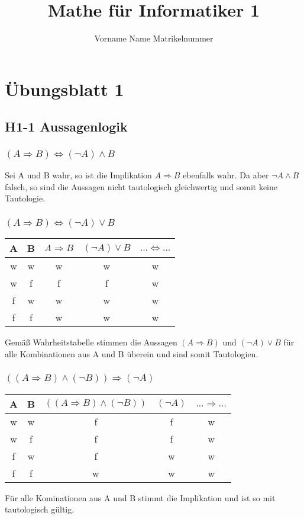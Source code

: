 \documentclass{article}
\title{Mathe für Informatiker 1}
\author{Vorname Name Matrikelnummer}
\begin{document}
\maketitle

\section{Übungsblatt 1}
\subsection{H1-1 Aussagenlogik}
\subsubsection{\((A \Rightarrow B) \iff (\neg A) \land B  \)}

Sei A und B wahr, so ist die Implikation \(A \Rightarrow B\) ebenfalls wahr.
Da aber \(\neg A \land B  \) falsch, so sind die Aussagen nicht tautologisch gleichwertig und somit keine Tautologie.

\subsubsection{\((A \Rightarrow B) \iff (\neg A) \lor B  \)}
\begin{center}
\begin{tabular}{||c c | c c | c ||}
  A & B & \(A \Rightarrow B\) & \((\neg A) \lor B\) &\(... \iff ...\) \\
  \hline
  w & w & w & w & w \\
  w & f & f & f & w \\
  f & w & w & w & w \\
  f & f & w & w & w \\
\end{tabular}
\end{center}
Gemäß Wahrheitstabelle stimmen die Aussagen \((A \Rightarrow B) \) und \( (\neg A) \lor B  \)  für alle Kombinationen aus A und B überein und sind somit Tautologien.

\subsubsection{\(((A \Rightarrow B) \land (\neg B)) \Rightarrow  (\neg A)  \)}

\begin{center}
\begin{tabular}{||c c | c c| c ||}
  A & B & \(((A \Rightarrow B) \land (\neg B))\) & \((\neg A)\)  & \(... \Rightarrow ...\) \\
  \hline
  w & w & f & f & w \\
  w & f & f & f & w \\
  f & w & f & w & w \\
  f & f & w & w & w \\
\end{tabular}
\end{center}
Für alle Kominationen aus A und B stimmt die Implikation und ist so mit tautologisch gültig.
\end{document}
